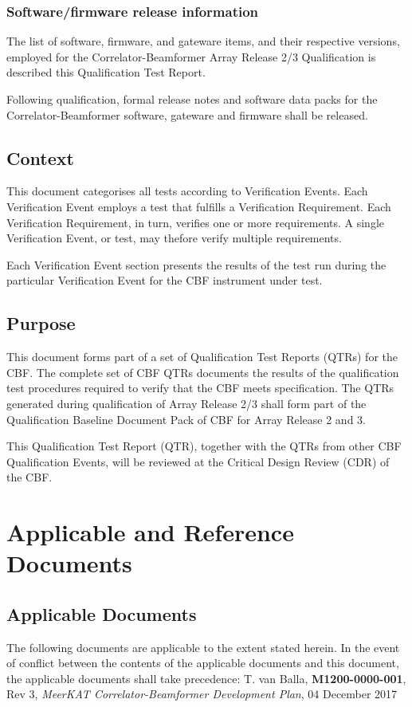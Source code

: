 \subsection{Software/firmware release information}
The list of software, firmware, and gateware items, and their respective versions, employed for the Correlator-Beamformer Array Release 2/3 Qualification is described this Qualification Test Report.

Following qualification, formal release notes and software data packs for the Correlator-Beamformer software, gateware and firmware shall be released.
\section{Context}
This document categorises all tests according to Verification Events. Each Verification Event employs a test that fulfills a Verification Requirement. Each Verification Requirement, in turn, verifies one or more requirements. A single Verification Event, or test, may thefore verify multiple requirements.

Each Verification Event section presents the results of the test run during the particular Verification Event for the CBF instrument under test.
\section{Purpose}
This document forms part of a set of Qualification Test Reports (QTRs) for the CBF. The complete set of CBF QTRs documents the results of the qualification test procedures required to verify that the CBF meets specification. The QTRs generated during qualification of Array Release 2/3 shall form part of the Qualification Baseline Document Pack of CBF for Array Release 2 and 3.\newline

This Qualification Test Report (QTR), together with the QTRs from other CBF Qualification Events, will be reviewed at the Critical Design Review (CDR) of the CBF.
\chapter{Applicable and Reference Documents}
\section{Applicable Documents}
The following documents are applicable to the extent stated herein. In the event of conflict between the contents of the applicable documents and this document, the applicable documents shall take precedence:\newline\newline
[1]\hspace{10mm} T. van Balla, {\bf M1200-0000-001}, Rev 3, {\it MeerKAT Correlator-Beamformer Development Plan}, 04 December 2017\newline\
